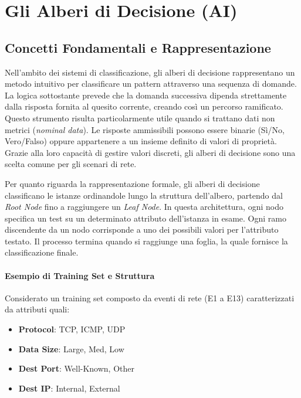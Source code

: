 \section{Gli Alberi di Decisione (AI)}

\subsection{Concetti Fondamentali e Rappresentazione}

Nell'ambito dei sistemi di classificazione, gli alberi di
decisione rappresentano un metodo intuitivo per classificare
un pattern attraverso una sequenza di domande. La logica
sottostante prevede che la domanda successiva dipenda
strettamente dalla risposta fornita al quesito corrente,
creando così un percorso ramificato. Questo strumento risulta
particolarmente utile quando si trattano dati non metrici
(\textit{nominal data}). Le risposte ammissibili possono
essere binarie (Sì/No, Vero/Falso) oppure appartenere a un
insieme definito di valori di proprietà. Grazie alla loro
capacità di gestire valori discreti, gli alberi di decisione
sono una scelta comune per gli scenari di rete.

Per quanto riguarda la rappresentazione formale, gli alberi
di decisione classificano le istanze ordinandole lungo la
struttura dell'albero, partendo dal
\textit{Root Node} fino a raggiungere un
\textit{Leaf Node}. In questa
architettura, ogni nodo specifica un test su un determinato
attributo dell'istanza in esame. Ogni ramo discendente da
un nodo corrisponde a uno dei possibili valori per
l'attributo testato. Il processo termina quando si raggiunge
una foglia, la quale fornisce la classificazione finale.

\paragraph{Esempio di Training Set e Struttura}

Considerato un
training set composto da eventi di rete (E1 a E13)
caratterizzati da attributi quali:

\begin{itemize}
    \item \textbf{Protocol}: TCP, ICMP, UDP
    \item \textbf{Data Size}: Large, Med, Low
    \item \textbf{Dest Port}: Well-Known, Other
    \item \textbf{Dest IP}: Internal, External
\end{itemize}


